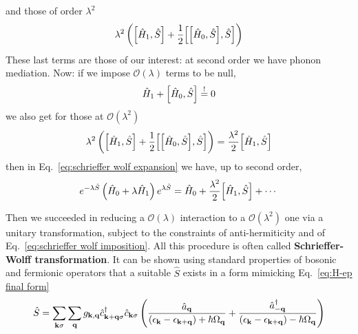 and those of order $\lambda^2$
\[
	\lambda^2 \lrR{\comm{\hat H_1}{\hat S} + \half \comm{\comm{\hat H_0}{\hat S}}{\hat S \vphantom{A^A}}}
\]
These last terms are those of our interest: at second order we have phonon mediation.
Now: if we impose $\mathcal{O}(\lambda)$ terms to be null,
\begin{equation}\label{eq:schrieffer wolf imposition}
	\hat H_1 + \comm{\hat H_0}{\hat S} \imp 0
\end{equation}
we also get for those at $\mathcal{O}(\lambda^2)$
\[
	\lambda^2 \lrR{\comm{\hat H_1}{\hat S} + \half \comm{\comm{\hat H_0}{\hat S}}{\hat S \vphantom{A^A}}} = \frac{\lambda^2}{2} \comm{\hat H_1}{\hat S}
\]
then in Eq.~\eqref{eq:schrieffer wolf expansion} we have, up to second order,
\begin{equation}\label{eq:schrieffer wolf final}
	e^{-\lambda \hat S} \lrR{\hat H_0 + \lambda \hat H_1} e^{\lambda \hat S} = \hat H_0 + \frac{\lambda^2}{2} \comm{\hat H_1}{\hat S} + \cdots
\end{equation}

Then we succeeded in reducing a $\mathcal{O}(\lambda)$ interaction to a $\mathcal{O}(\lambda^2)$ one via a unitary transformation, subject to the constraints of anti-hermiticity and of Eq.~\eqref{eq:schrieffer wolf imposition}. All this procedure is often called \textbf{Schrieffer-Wolff transformation}.
It can be shown using standard properties of bosonic and fermionic operators that a suitable $\hat S$ exists in a form mimicking Eq.~\eqref{eq:H-ep final form}
\begin{equation}\label{eq:schrieffer-wolf S operator}
	\hat S = \sum_{\mathbf{k}\sigma} \sum_\mathbf{q} g_{\mathbf{k},\mathbf{q}} \hat{c}_{\mathbf{k}+\mathbf{q}\sigma}^\dagger \hat{c}_{\mathbf{k}\sigma} \left({
		\frac{\hat{a}_\mathbf{q}}{\left({\epsilon_\mathbf{k} - \epsilon_{\mathbf{k}+\mathbf{q}}}\right)+\hbar\Omega_\mathbf{q}} + \frac{\hat{a}_{-\mathbf{q}}^\dagger}{\left({\epsilon_\mathbf{k} - \epsilon_{\mathbf{k}+\mathbf{q}}}\right)-\hbar\Omega_\mathbf{q}}
	}\right)
\end{equation}

